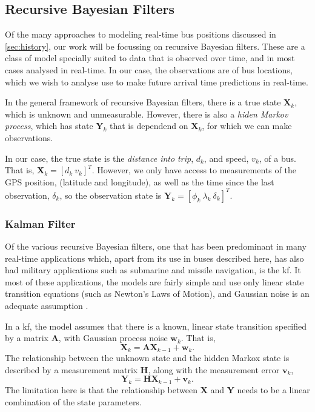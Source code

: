 \documentclass[12pt,a4paper]{article}
\newcommand{\bY}{\mathbf{Y}}
\newcommand{\bX}{\mathbf{X}}
\newcommand{\mat}[1]{\mathbf{#1}}
\begin{document}
\subsection{Recursive Bayesian Filters}
\label{sec:recursive}


Of the many approaches to modeling real-time bus positions discussed in \cref{sec:history},
our work will be focussing on recursive Bayesian filters.
These are a class of model specially suited to data that is observed over time,
and in most cases analysed in real-time.
In our case, the observations are of bus locations,
which we wish to analyse use to make future arrival time predictions in real-time.


In the general framework of recursive Bayesian filters,
there is a true state $\bX_k$, which is unknown and unmeasurable.
However, there is also a \emph{hiden Markov process},
which has state $\bY_k$ that is dependend on $\bX_k$, 
for which we can make observations.


In our case, the true state is the \emph{distance into trip}, $d_k$, 
and speed, $v_k$, of a bus.
That is, $\bX_k = [d_k\ v_k]^T$.
However, we only have access to measurements of the GPS position, 
(latitude and longitude), 
as well as the time since the last observation, $\delta_k$,
so the observation state is $\bY_k = [\phi_k\ \lambda_k\ \delta_k]^T$.



\subsubsection{Kalman Filter}
\label{sec:kalman_filter}

Of the various recursive Bayesian filters, one that has been predominant in 
many real-time applications which, apart from its use in buses described here,
has also had military applications such as submarine and missile navigation, 
is the \gls{kf}.
It most of these applications, the models are fairly simple and use only
linear state transition equations (such as Newton's Laws of Motion),
and Gaussian noise is an adequate assumption \citep{cn}.


In a \gls{kf}, the model assumes that there is a known, linear state transition specified by
a matrix $\mat{A}$, with Gaussian process noise $\mat{w}_k$.
That is, 
\begin{equation}
  \label{eq:kf_statetransition}
  \bX_k = \mat{A}\bX_{k-1} + \mat{w}_k.
\end{equation}
The relationship between the unknown state and the hidden Markox state is described
by a measurement matrix $\mat{H}$, along with the measurement error $\mat{v}_k$,
\begin{equation}
  \label{eq:kf_measurement}
  \bY_k = \mat{H}\bX_{k-1} + \mat{v}_k.
\end{equation}
The limitation here is that the relationship between $\bX$ and $\bY$ needs to be a linear
combination of the state parameters.
\end{document}
